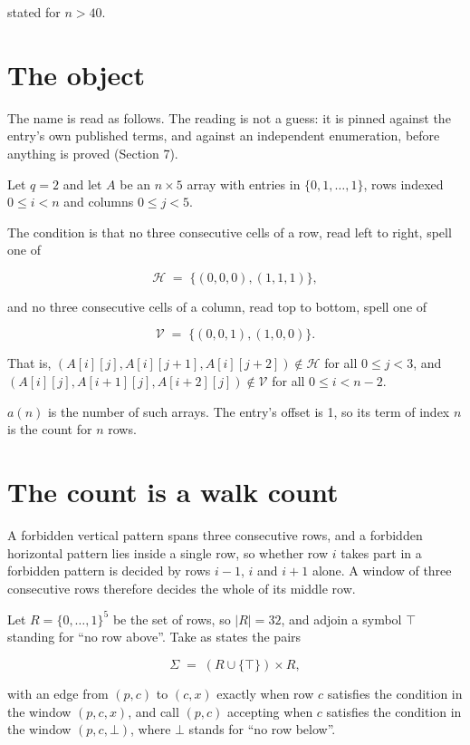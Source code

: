 \documentclass[11pt]{article}
\theoremstyle{definition}
\begin{document}
stated for $n > 40$.

\section{The object}

The name is read as follows. The reading is not a guess: it is pinned against the entry's own published terms, and against an independent enumeration, before anything is proved (Section 7).

Let $q = 2$ and let $A$ be an $n \times 5$ array with entries in $\{0,1,\dots,1\}$, rows indexed $0 \le i < n$ and columns $0 \le j < 5$.

The condition is that no three consecutive cells of a row, read left to right, spell one of

\[\mathcal{H} \;=\; \{(0,0,0), (1,1,1)\},\]

and no three consecutive cells of a column, read top to bottom, spell one of

\[\mathcal{V} \;=\; \{(0,0,1), (1,0,0)\}.\]

That is, $(A[i][j],A[i][j{+}1],A[i][j{+}2]) \notin \mathcal{H}$ for all $0 \le j < 3$, and $(A[i][j],A[i{+}1][j],A[i{+}2][j]) \notin \mathcal{V}$ for all $0 \le i < n-2$.

$a(n)$ is the number of such arrays. The entry's offset is 1, so its term of index $n$ is the count for $n$ rows.

\section{The count is a walk count}

A forbidden vertical pattern spans three consecutive rows, and a forbidden horizontal pattern lies inside a single row, so whether row $i$ takes part in a forbidden pattern is decided by rows $i-1$, $i$ and $i+1$ alone. A window of three consecutive rows therefore decides the whole of its middle row.

Let $R = \{0,\dots,1\}^{5}$ be the set of rows, so $|R| = 32$, and adjoin a symbol $\top$ standing for ``no row above''. Take as states the pairs

\[\Sigma \;=\; (R \cup \{\top\}) \times R,\]

with an edge from $(p,c)$ to $(c,x)$ exactly when row $c$ satisfies the condition in the window $(p,c,x)$, and call $(p,c)$ accepting when $c$ satisfies the condition in the window $(p,c,\bot)$, where $\bot$ stands for ``no row below''.
\end{document}
